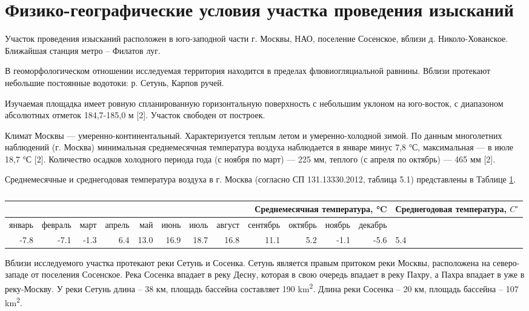 \chapter*{Физико-географические условия участка проведения изысканий}
 
Участок проведения изысканий расположен в юго-заподной части г. Москвы, НАО, поселение Сосенское, 
вблизи д. Николо-Хованское. Ближайшая станция метро – Филатов луг.

В геоморфологическом отношении исследуемая территория находится в пределах флювиогляциальной равнины. 
Вблизи протекают небольшие постоянные водотоки: р. Сетунь, Карпов ручей.

Изучаемая площадка имеет ровную спланированную горизонтальную поверхность с небольшим уклоном на юго-восток, 
с диапазоном абсолютных отметок 184,7-185,0 м [2]. Участок свободен от построек.

Климат Москвы — умеренно-континентальный. 
Характеризуется теплым летом и умеренно-холодной зимой.
По данным многолетних наблюдений (г. Москва) минимальная среднемесячная температура воздуха наблюдается в январе минус 7,8 °С, максимальная — в июле 18,7 °С [2]. 
Количество осадков холодного периода года (с ноября по март) — 225 мм, теплого (с апреля по октябрь) — 465 мм [2]. 

Среднемесячные и среднегодовая температура воздуха в г. Москва (согласно СП 131.13330.2012, таблица 5.1) 
представлены в Таблице \ref{tab:temperature}.

\begin{table} [htbp]%
    \centering
    \begin{threeparttable}%
      \captiondelim{}%
      \caption{}%
      \label{tab:temperature}%
      \begin{SingleSpace}
        \begin{tabular}{| r | r | r | r | r | r | r | r | r | r | r | r | p{3cm} |}
        \hline
        \multicolumn{12}{|r|}{Среднемесячная температура, \si{\degreeCelsius}} &  \makecell{Среднегодовая \\ температура, $C^\circ$} \\ \hline
        январь & февраль & март & апрель & май & июнь & июль & август & сентябрь & октябрь & ноябрь & декабрь & \\ \hline
        -7.8   & -7.1  & -1.3  & 6.4  & 13.0  & 16.9  & 18.7  & 16.8  & 11.1  & 5.2  & -1.1  & -5.6  & 5.4\\ \hline
        \end{tabular}%
      \end{SingleSpace}
    \end{threeparttable}
  \end{table}

Вблизи исследуемого участка протекают реки Сетунь и Сосенка. 
Сетунь является правым притоком реки Москвы, расположена на северо-западе от поселения Сосенское. 
Река Сосенка впадает в реку Десну, которая в свою очередь впадает в реку Пахру, а Пахра впадает в уже в реку-Москву. 
У реки Сетунь длина – 38 км, площадь бассейна составляет 190 \si{\kilo\meter^2}. 
Длина реки Сосенка – 20 км, площадь бассейна – 107 \si{\kilo\meter^2}.